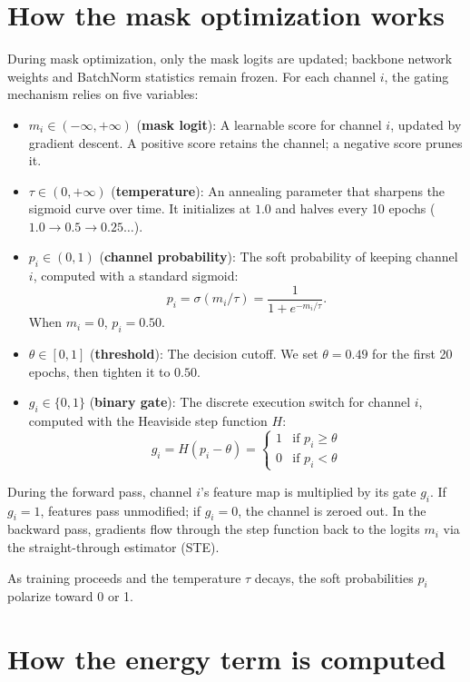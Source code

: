 \section{How the mask optimization works}

During mask optimization, only the mask logits are updated; backbone network weights and BatchNorm statistics remain frozen. For each channel $i$, the gating mechanism relies on five variables:

\begin{itemize}
    \item $m_i \in (-\infty, +\infty)$ (\textbf{mask logit}): A learnable score for channel $i$, updated by gradient descent. A positive score retains the channel; a negative score prunes it.
    \item $\tau \in (0, +\infty)$ (\textbf{temperature}): An annealing parameter that sharpens the sigmoid curve over time. It initializes at $1.0$ and halves every 10 epochs ($1.0 \to 0.5 \to 0.25 \dots$).
    \item $p_i \in (0, 1)$ (\textbf{channel probability}): The soft probability of keeping channel $i$, computed with a standard sigmoid:
    $$
    p_i = \sigma(m_i / \tau) = \frac{1}{1 + e^{-m_i / \tau}}.
    $$
    When $m_i = 0$, $p_i = 0.50$.
    \item $\theta \in [0, 1]$ (\textbf{threshold}): The decision cutoff. We set $\theta = 0.49$ for the first 20 epochs, then tighten it to $0.50$.
    \item $g_i \in \{0, 1\}$ (\textbf{binary gate}): The discrete execution switch for channel $i$, computed with the Heaviside step function $H$:
    $$
    g_i = H(p_i - \theta) = \begin{cases} 1 & \text{if } p_i \ge \theta \\ 0 & \text{if } p_i < \theta \end{cases}
    $$
\end{itemize}

During the forward pass, channel $i$'s feature map is multiplied by its gate $g_i$. If $g_i = 1$, features pass unmodified; if $g_i = 0$, the channel is zeroed out. In the backward pass, gradients flow through the step function back to the logits $m_i$ via the straight-through estimator (STE).

As training proceeds and the temperature $\tau$ decays, the soft probabilities $p_i$ polarize toward 0 or 1.

\section{How the energy term is computed}

